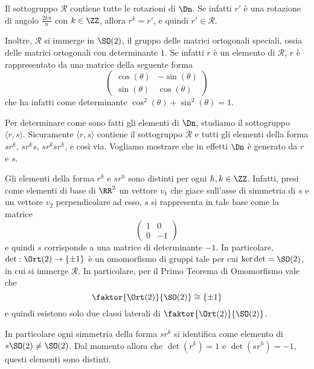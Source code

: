\documentclass[11pt]{scrartcl}
\begin{document}
	\begin{remark}
		Il sottogruppo $\mathcal{R}$ contiene tutte le rotazioni di $\Dn$.
		Se infatti $r'$ è una rotazione di angolo $\frac{2k\pi}{n}$ con $k \in \ZZ$,
		allora $r^k = r'$, e quindi $r' \in \mathcal{R}$. \medskip
		
		
		Inoltre, $\mathcal{R}$ si immerge in $\SO(2)$, il gruppo delle matrici ortogonali speciali,
		ossia delle matrici ortogonali con determinante $1$. Se infatti $r$ è un elemento
		di $\mathcal{R}$, $r$
		è rappresentato da una matrice della seguente forma
		\[ \begin{pmatrix}
			\cos(\theta) & -\sin(\theta) \\
			\sin(\theta) & \cos(\theta)
		\end{pmatrix} \]
		che ha infatti come determinante $\cos^2(\theta) + \sin^2(\theta) = 1$.
	\end{remark}
	
	Per determinare come sono fatti gli elementi di $\Dn$, studiamo il sottogruppo
	$\langle r, s\rangle$. Sicuramente $\langle r, s\rangle$ contiene il sottogruppo $\mathcal{R}$
	e tutti gli elementi della forma $sr^k$, $sr^ks$, $sr^ksr^h$, e così via. Vogliamo
	mostrare che in effetti $\Dn$ è generato da $r$ e $s$.
	
	\begin{remark}
		\label{obs1.11}
		Gli elementi della forma $r^k$ e $sr^h$ sono distinti per ogni $h, k \in \ZZ$.
		Infatti, presi come elementi di base di $\RR^2$ un vettore $v_1$ che giace sull'asse
		di simmetria di $s$ e un vettore $v_2$ perpendicolare ad esso, $s$
		si rappresenta in tale base come la matrice
		\[ \begin{pmatrix}
			1 & 0 \\
			0 & -1
		\end{pmatrix} \]
		e quindi $s$ corrisponde a una matrice di determinante $-1$. In particolare,
		$\det : \Ort(2) \to \{\pm 1\}$ è un omomorfismo di gruppi tale per cui
		$\ker \det = \SO(2)$, in cui si immerge $\mathcal{R}$. In particolare, per
		il Primo Teorema di Omomorfismo vale che
		\[ \faktor{\Ort(2)}{\SO(2)} \cong \{\pm 1\} \]
		e quindi
		esistono solo due classi laterali di $\faktor{\Ort(2)}{\SO(2)}$. \medskip
		
		
		In particolare
		ogni simmetria della forma $s r^k$ si identifica come elemento di $s \SO(2) \neq \SO(2)$.
		Dal momento allora che $\det(r^k) = 1$ e $\det(sr^h) = -1$, questi elementi sono
		distinti.
	\end{remark}
	
\end{document}
